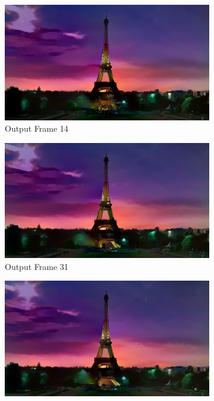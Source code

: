 \documentclass[runningheads]{llncs}
\begin{document}
\begin{figure}[h!]
\begin{subfigure}[t]{0.3\linewidth}
    \centering
    \includegraphics[width=1\linewidth]{best14.png}
    \caption{Output Frame 14}
\end{subfigure}
\begin{subfigure}[t]{0.3\linewidth}
    \centering
    \includegraphics[width=1\linewidth]{best31.png}
    \caption{Output Frame 31}
\end{subfigure}
\begin{subfigure}[t]{0.3\linewidth}
    \centering
    \includegraphics[width=1\linewidth]{best52.png}

\end{subfigure}
\end{figure}
\end{document}
